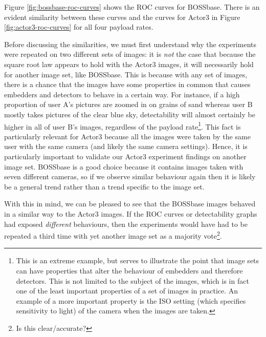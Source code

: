 \documentclass[11pt,a4paper,twoside,openright]{report}
\begin{document}
Figure \ref{fig:bossbase-roc-curves} shows the ROC curves for BOSSbase. There is an evident similarity between these curves and the curves for Actor3 in Figure \ref{fig:actor3-roc-curves} for all four payload rates.

Before discussing the similarities, we must first understand why the experiments were repeated on two different sets of images: it is \textit{not} the case that because the square root law appears to hold with the Actor3 images, it will necessarily hold for another image set, like BOSSbase. This is because with any set of images, there is a chance that the images have some properties in common that causes embedders and detectors to behave in a certain way. For instance, if a high proportion of user A's pictures are zoomed in on grains of sand whereas user B mostly takes pictures of the clear blue sky, detectability will almost certainly be higher in all of user B's images, regardless of the payload rate\footnote{This is an extreme example, but serves to illustrate the point that image sets can have properties that alter the behaviour of embedders and therefore detectors. This is not limited to the subject of the images, which is in fact one of the least important properties of a set of images in practice. An example of a more important property is the ISO setting (which specifies sensitivity to light) of the camera when the images are taken.}. This fact is particularly relevant for Actor3 because all the images were taken by the same user with the same camera (and likely the same camera settings). Hence, it is particularly important to validate our Actor3 experiment findings on another image set. BOSSbase is a good choice because it contains images taken with seven different cameras, so if we observe similar behaviour again then it is likely be a general trend rather than a trend specific to the image set.

With this in mind, we can be pleased to see that the BOSSbase images behaved in a similar way to the Actor3 images. If the ROC curves or detectability graphs had exposed \textit{different} behaviours, then the experiments would have had to be repeated a third time with yet another image set as a majority vote\footnote{Is this clear/accurate?}.
\end{document}
